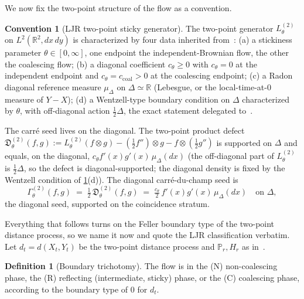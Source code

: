 \documentclass[reqno,final,11pt]{amsart}
\theoremstyle{plain}
\theoremstyle{definition}
\newtheorem{definition}[theorem]{Definition}
\newtheorem{convention}[theorem]{Convention}
\theoremstyle{remark}
\newcommand{\R}{\mathbb R}
\newcommand{\Prob}{\mathbb P}
\newcommand{\GamT}{\Gamma^{(2)}_{\theta}}
\newcommand{\Lth}[1]{L^{(#1)}_{\theta}}
\newcommand{\muD}{\mu_{\Delta}}
\newcommand{\cth}{c_{\theta}}
\begin{document}
We now fix the two-point structure of the flow as a convention.

\begin{convention}[LJR two-point sticky generator]
\label{conv:LJR}
The two-point generator $\Lth{2}$ on $L^2(\R^2,dx\,dy)$ is characterized by
four data inherited from~\citep{LJR-FCN}:
\textnormal{(a)} a stickiness parameter $\theta\in[0,\infty]$, one endpoint
the independent-Brownian flow, the other the coalescing flow;
\textnormal{(b)} a diagonal coefficient $\cth\ge0$ with
$\cth=0$ at the independent endpoint and $\cth=c_{\mathrm{coal}}>0$ at the
coalescing endpoint;
\textnormal{(c)} a Radon diagonal reference measure $\muD$ on
$\Delta\simeq\R$ (Lebesgue, or the local-time-at-$0$ measure of $Y-X$);
\textnormal{(d)} a Wentzell-type boundary condition on $\Delta$
characterized by $\theta$, with off-diagonal action $\tfrac12\Delta$, the
exact statement delegated to~\citep{LJR-FCN}.
\end{convention}

The carr\'e seed lives on the diagonal. The two-point product defect
$\mathfrak D^{(2)}_\theta(f,g):=\Lth{2}(f\otimes g)-(\tfrac12 f'')\otimes g
-f\otimes(\tfrac12 g'')$ is supported on $\Delta$ and equals, on the diagonal,
$\cth f'(x)g'(x)\,\muD(dx)$ (the off-diagonal part of $\Lth{2}$ is
$\tfrac12\Delta$, so the defect is diagonal-supported; the diagonal density is
fixed by the Wentzell condition of \cref{conv:LJR}(d)). The diagonal
carr\'e-du-champ seed is
\begin{equation}\label{eq:gamma-seed}
  \GamT(f,g)\;=\;\tfrac12\,\mathfrak D^{(2)}_\theta(f,g)
  \;=\;\tfrac{\cth}{2}\,f'(x)g'(x)\,\muD(dx)\quad\text{on }\Delta,
\end{equation}
the diagonal seed, supported on the coincidence stratum.

Everything that follows turns on the Feller boundary type of the two-point
distance process, so we name it now and quote the LJR classification verbatim. Let
$d_t=d(X_t,Y_t)$ be the two-point distance process and
$\Prob_r,H_r$ as in~\citep[\S9]{LJR-FCN}.

\begin{definition}[Boundary trichotomy]\label{def:trichotomy}
The flow is in the
\textnormal{(N)} non-coalescing phase, the
\textnormal{(R)} reflecting (intermediate, sticky) phase, or the
\textnormal{(C)} coalescing phase, according to the boundary type of
$0$ for $d_t$.
\end{definition}
\end{document}
